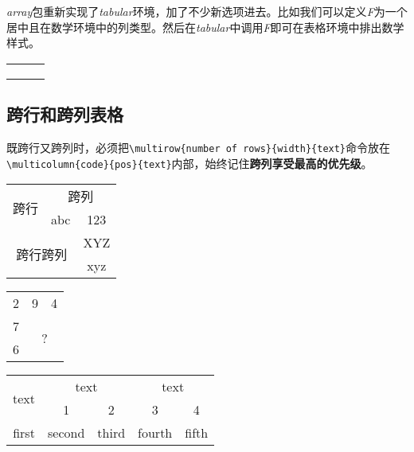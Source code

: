 \emph{array}包重新实现了\emph{tabular}环境，加了不少新选项进去。比如我们可以定义\emph{F}为一个居中且在数学环境中的列类型。然后在\emph{tabular}中调用\emph{F}即可在表格环境中排出数学样式。

\begin{codeshow}
\centering
\begin{tabular}{FFF}
    \alpha & \beta    & \gamma   \\
    \delta & \epsilon & \upsilon \\
    \sigma & \tau     & \phi     \\
\end{tabular}
\end{codeshow}

\subsection{跨行和跨列表格}


既跨行又跨列时，必须把\lstinline|\multirow{number of rows}{width}{text}|命令放在\lstinline|\multicolumn{code}{pos}{text}|内部，始终记住\textbf{跨列享受最高的优先级}。

\begin{codeshow}
\centering
\begin{tabular}{|c|c|c|}
    \hline
    \multirow{2}{*}{跨行} & \multicolumn{2}{c|}{跨列} \\ \cline{2-3}
     & abc & 123 \\ \hline
    \multicolumn{2}{|c|}{\multirow{2}{*}{跨行跨列}} & XYZ \\ \cline{3-3}
    \multicolumn{2}{|c|}{} & xyz \\ \hline
\end{tabular}
\end{codeshow}

\begin{codeshow}
\centering
\begin{tabular}{|ccc|}
    \hline
    2 & 9 & 4 \\
    7 & \multicolumn{2}{c|}{\multirow{2}{*}{?}}\\
    6& & \\ \hline
\end{tabular}
\end{codeshow}

\begin{codeshow}
\centering
\begin{tabular}{ccccc}
    \toprule
    \multirow{2}{*}{text} & \multicolumn{2}{c}{text} & \multicolumn{2}{c}{text} \\
    \cmidrule(lr){2-3} \cmidrule(lr){4-5}
    & 1 & 2 & 3 & 4 \\
    \midrule
    first & second & third & fourth & fifth\\
    \bottomrule
\end{tabular}
\end{codeshow}

